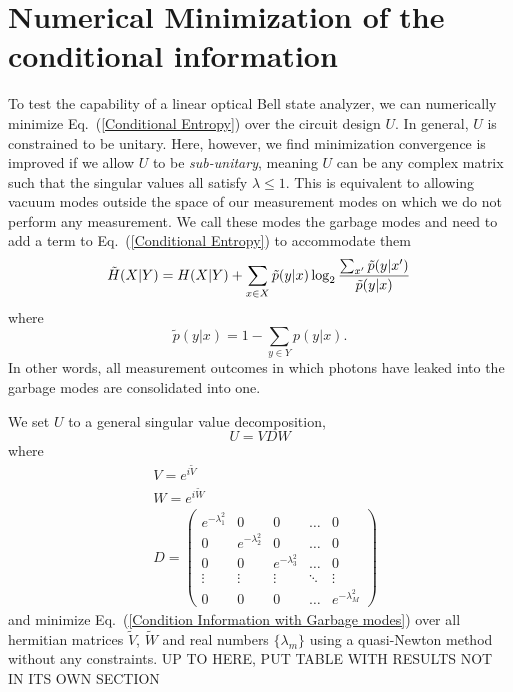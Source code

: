 \documentclass[aps,pra,twocolumn,showpacs,superscriptaddress,floatfix,10pt]{revtex4}
\begin{document}
\section{Numerical Minimization of the conditional information}
To test the capability of a linear optical Bell state analyzer, we can numerically minimize Eq.~(\ref{Conditional Entropy}) over the circuit design $U$. In general, $U$ is constrained to be unitary. Here, however, we find minimization convergence is improved if we allow $U$ to be \textit{sub-unitary}, meaning $U$ can be any complex matrix such that the singular values all satisfy $\lambda \le 1$. This is equivalent to allowing vacuum modes outside the space of our measurement modes on which we do not perform any measurement. We call these modes the garbage modes and need to add a term to Eq.~(\ref{Conditional Entropy}) to accommodate them
\begin{equation}
\label{Condition Information with Garbage modes}
\small	\tilde{H}(X|Y) = H(X|Y) + \sum_{x \in X} \tilde{p}(y|x) \log_2 \frac{\sum_{x^\prime} \tilde{p}(y|x^\prime)}{\tilde{p}(y|x)}\,
\end{equation}
where
\begin{equation}
	\tilde{p}(y|x) = 1 - \sum_{y \in Y} p(y|x).
\end{equation}
In other words, all measurement outcomes in which photons have leaked into the garbage modes are consolidated into one.

We set $U$ to a general singular value decomposition,
\begin{equation}
	\label{Singular Value Decomposition}
	U = V D W
\end{equation}
where
\begin{eqnarray}
	& V = e^{i \tilde{V}} \\
	& W = e^{i \tilde{W}} \\
	& D =  \begin{pmatrix} e^{-\lambda^2_1} & 0 & 0 & \hdots & 0 \\ 0 & e^{-\lambda^2_2} & 0 & \hdots & 0 \\ 0 & 0 & e^{-\lambda^2_3} & \hdots & 0 \\ \vdots
	& \vdots & \vdots & \ddots & \vdots \\
	0 & 0 & 0 & \hdots & e^{-\lambda^2_M} \end{pmatrix} 
\end{eqnarray}
and minimize Eq.~(\ref{Condition Information with Garbage modes}) over all hermitian matrices $\tilde{V}$, $\tilde{W}$ and real numbers $\{\lambda_m\}$ using a quasi-Newton method without any constraints.
UP TO HERE, PUT TABLE WITH RESULTS NOT IN ITS OWN SECTION
\end{document}
